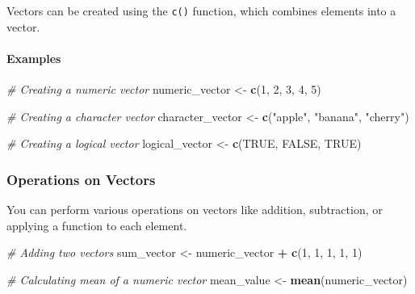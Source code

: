 \documentclass[
  b5paper]{book}
\newenvironment{Shaded}{\begin{snugshade}}{\end{snugshade}}
\newcommand{\CommentTok}[1]{\textcolor[rgb]{0.56,0.35,0.01}{\textit{#1}}}
\newcommand{\ConstantTok}[1]{\textcolor[rgb]{0.56,0.35,0.01}{#1}}
\newcommand{\DecValTok}[1]{\textcolor[rgb]{0.00,0.00,0.81}{#1}}
\newcommand{\FunctionTok}[1]{\textcolor[rgb]{0.13,0.29,0.53}{\textbf{#1}}}
\newcommand{\NormalTok}[1]{#1}
\newcommand{\OtherTok}[1]{\textcolor[rgb]{0.56,0.35,0.01}{#1}}
\newcommand{\SpecialCharTok}[1]{\textcolor[rgb]{0.81,0.36,0.00}{\textbf{#1}}}
\newcommand{\StringTok}[1]{\textcolor[rgb]{0.31,0.60,0.02}{#1}}
\begin{document}
Vectors can be created using the \texttt{c()} function, which combines elements into a vector.

\hypertarget{examples-2}{%
\paragraph*{Examples}\label{examples-2}}

\begin{Shaded}
\begin{Highlighting}[]
\CommentTok{\# Creating a numeric vector}
\NormalTok{numeric\_vector }\OtherTok{\textless{}{-}} \FunctionTok{c}\NormalTok{(}\DecValTok{1}\NormalTok{, }\DecValTok{2}\NormalTok{, }\DecValTok{3}\NormalTok{, }\DecValTok{4}\NormalTok{, }\DecValTok{5}\NormalTok{)}

\CommentTok{\# Creating a character vector}
\NormalTok{character\_vector }\OtherTok{\textless{}{-}} \FunctionTok{c}\NormalTok{(}\StringTok{"apple"}\NormalTok{, }\StringTok{"banana"}\NormalTok{, }\StringTok{"cherry"}\NormalTok{)}

\CommentTok{\# Creating a logical vector}
\NormalTok{logical\_vector }\OtherTok{\textless{}{-}} \FunctionTok{c}\NormalTok{(}\ConstantTok{TRUE}\NormalTok{, }\ConstantTok{FALSE}\NormalTok{, }\ConstantTok{TRUE}\NormalTok{)}
\end{Highlighting}
\end{Shaded}

\hypertarget{operations-on-vectors}{%
\subsubsection*{Operations on Vectors}\label{operations-on-vectors}}

You can perform various operations on vectors like addition, subtraction, or applying a function to each element.

\begin{Shaded}
\begin{Highlighting}[]
\CommentTok{\# Adding two vectors}
\NormalTok{sum\_vector }\OtherTok{\textless{}{-}}\NormalTok{ numeric\_vector }\SpecialCharTok{+} \FunctionTok{c}\NormalTok{(}\DecValTok{1}\NormalTok{, }\DecValTok{1}\NormalTok{, }\DecValTok{1}\NormalTok{, }\DecValTok{1}\NormalTok{, }\DecValTok{1}\NormalTok{)}

\CommentTok{\# Calculating mean of a numeric vector}
\NormalTok{mean\_value }\OtherTok{\textless{}{-}} \FunctionTok{mean}\NormalTok{(numeric\_vector)}
\end{Highlighting}
\end{Shaded}
\end{document}
